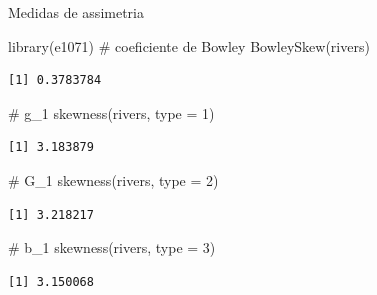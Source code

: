 \documentclass[
  10pt,
  ignorenonframetext,
]{beamer}
\newenvironment{Shaded}{\begin{snugshade}}{\end{snugshade}}
\newcommand{\AttributeTok}[1]{\textcolor[rgb]{0.40,0.45,0.13}{#1}}
\newcommand{\CommentTok}[1]{\textcolor[rgb]{0.37,0.37,0.37}{#1}}
\newcommand{\DecValTok}[1]{\textcolor[rgb]{0.68,0.00,0.00}{#1}}
\newcommand{\FunctionTok}[1]{\textcolor[rgb]{0.28,0.35,0.67}{#1}}
\newcommand{\NormalTok}[1]{\textcolor[rgb]{0.00,0.23,0.31}{#1}}
\begin{document}
\begin{frame}[fragile]{Medidas de assimetria}
\protect\hypertarget{medidas-de-assimetria-1}{}
\begin{Shaded}
\begin{Highlighting}[]
\FunctionTok{library}\NormalTok{(e1071)}
\CommentTok{\# coeficiente de Bowley}
\FunctionTok{BowleySkew}\NormalTok{(rivers)}
\end{Highlighting}
\end{Shaded}

\begin{verbatim}
[1] 0.3783784
\end{verbatim}

\begin{Shaded}
\begin{Highlighting}[]
\CommentTok{\# g\_1}
\FunctionTok{skewness}\NormalTok{(rivers, }\AttributeTok{type =} \DecValTok{1}\NormalTok{)}
\end{Highlighting}
\end{Shaded}

\begin{verbatim}
[1] 3.183879
\end{verbatim}

\begin{Shaded}
\begin{Highlighting}[]
\CommentTok{\# G\_1}
\FunctionTok{skewness}\NormalTok{(rivers, }\AttributeTok{type =} \DecValTok{2}\NormalTok{)}
\end{Highlighting}
\end{Shaded}

\begin{verbatim}
[1] 3.218217
\end{verbatim}

\begin{Shaded}
\begin{Highlighting}[]
\CommentTok{\# b\_1}
\FunctionTok{skewness}\NormalTok{(rivers, }\AttributeTok{type =} \DecValTok{3}\NormalTok{)}
\end{Highlighting}
\end{Shaded}

\begin{verbatim}
[1] 3.150068
\end{verbatim}
\end{frame}
\end{document}
